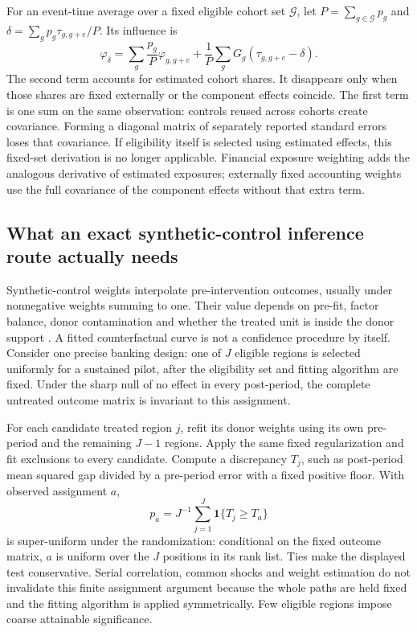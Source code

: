 For an event-time average over a fixed eligible cohort set $\mathcal G$,
let $P=\sum_{g\in\mathcal G}p_g$ and
$\delta=\sum_gp_g\tau_{g,g+e}/P$. Its influence is
\begin{equation}
 \varphi_\delta=
 \sum_g\frac{p_g}{P}\varphi_{g,g+e}
 +\frac1P\sum_g G_g(\tau_{g,g+e}-\delta).
 \label{s6:aggregate-att-if}
\end{equation}
The second term accounts for estimated cohort shares. It disappears only
when those shares are fixed externally or the component effects coincide.
The first term is one sum on the same observation: controls reused across
cohorts create covariance. Forming a diagonal matrix of separately reported
standard errors loses that covariance. If eligibility itself is selected
using estimated effects, this fixed-set derivation is no longer applicable.
Financial exposure weighting adds the analogous derivative of estimated
exposures; externally fixed accounting weights use the full covariance of
the component effects without that extra term.

\subsection{What an exact synthetic-control inference route actually needs}
Synthetic-control weights interpolate pre-intervention outcomes, usually
under nonnegative weights summing to one. Their value depends on pre-fit,
factor balance, donor contamination and whether the treated unit is inside
the donor support \citep{abadie2010,abadie2021,benmichael2021,synthdid2021}.
A fitted counterfactual curve is not a confidence procedure by itself.
Consider one precise banking design: one of $J$ eligible regions is selected
uniformly for a sustained pilot, after the eligibility set and fitting
algorithm are fixed. Under the sharp null of no effect in every post-period,
the complete untreated outcome matrix is invariant to this assignment.

For each candidate treated region $j$, refit its donor weights using its
own pre-period and the remaining $J-1$ regions. Apply the same fixed
regularization and fit exclusions to every candidate. Compute a discrepancy
$T_j$, such as post-period mean squared gap divided by a pre-period error
with a fixed positive floor. With observed assignment $a$,
\[
 p_a=J^{-1}\sum_{j=1}^J\mathbf1\{T_j\ge T_a\}
\]
is super-uniform under the randomization: conditional on the fixed outcome
matrix, $a$ is uniform over the $J$ positions in its rank list. Ties make
the displayed test conservative. Serial correlation, common shocks and
weight estimation do not invalidate this finite assignment argument because
the whole paths are held fixed and the fitting algorithm is applied
symmetrically. Few eligible regions impose coarse attainable significance.

